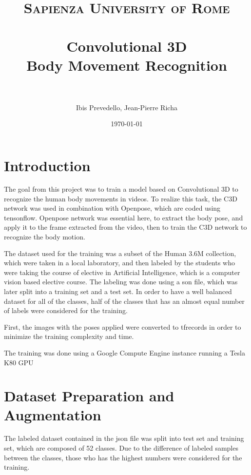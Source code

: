 \documentclass{article}
\title{
\normalfont \normalsize
\textsc{Sapienza University of Rome} \\ [25pt] %
\horrule{0.5pt} \\[0.4cm] %
\LARGE Convolutional 3D \\ %
\large Body Movement Recognition \\
\horrule{2pt} \\[0.5cm] %
}
\author{Ibis Prevedello, Jean-Pierre Richa} %
\date{\normalsize\today} %
\begin{document}
\sloppy %

\maketitle %



\section{Introduction}

The goal from this project was to train a model based on Convolutional 3D to recognize the human body movements in videos. To realize this task, the C3D network was used in combination with Openpose, which are coded using tensonflow. Openpose network was essential here, to extract the body pose, and apply it to the frame extracted from the video, then to train the C3D network to recognize the body motion. 

The dataset used for the training was a subset of the Human 3.6M collection, which were taken in a local laboratory, and then labeled by the students who were taking the course of elective in Artificial Intelligence, which is a computer vision based elective course. The labeling was done using a son file, which was later split into a training set and a test set. In order to have a well balanced dataset for all of the classes, half of the classes that has an almost equal number of labels were considered for the training. 

First, the images with the poses applied were converted to tfrecords in order to minimize the training complexity and time.

The training was done using a Google Compute Engine instance running a Tesla K80 GPU



\section{Dataset Preparation and Augmentation}

The labeled dataset contained in the json file was split into test set and training set, which are composed of 52 classes. Due to the difference of labeled samples between the classes, those who has the highest numbers were considered for the training. 
\end{document}
